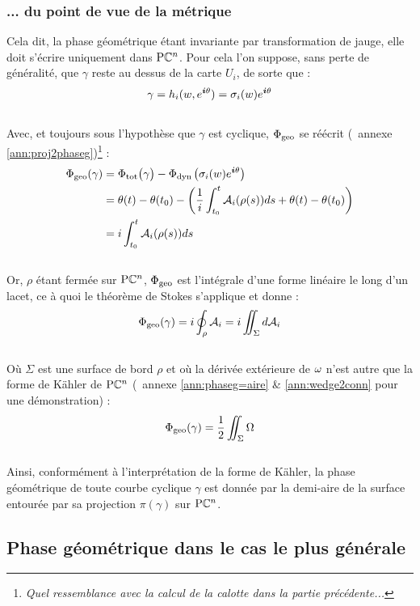 \subsubsection{... du point de vue de la métrique} \label{subsec:phase_g2aire}

Cela dit, la phase géométrique étant invariante par transformation de jauge, elle doit s'écrire uniquement dans $\text{\normalfont P}\mathbb{C}^{n}$. Pour cela l'on suppose, sans perte de généralité, que $\gamma$ reste au dessus de la carte $U_i$, de sorte que :
\[\gamma = h_i(w, e^{\boldsymbol{i} \theta}) = \sigma_i(w) e^{\boldsymbol{i} \theta}\]
\\
Avec, et toujours sous l'hypothèse que $\gamma$ est cyclique, $\Phi_{\text{\normalfont geo}}$ se réécrit (\cf~annexe \ref{ann:proj2phaseg})\footnote{\itshape
	Quel ressemblance avec la calcul de la calotte dans la partie précédente...}
 :
\begin{equation} \label{eq:phase_g=int2conn}
	\begin{aligned}
		\Phi_{\text{\normalfont geo}}(\gamma) &= \Phi_{\text{\normalfont tot}}\big( \gamma \big) - \Phi_{\text{\normalfont dyn}\, }\big( \sigma_i(w) e^{\boldsymbol{i} \theta} \big) \\
		&= \theta(t) - \theta(t_0) - \left( \frac{1}{i}\int_{t_0}^t \mathcal{A}_i(\rho(s)) ds + \theta(t) - \theta(t_0) \right) \\
		&= i \int_{t_0}^t \mathcal{A}_i(\rho(s)) ds
	\end{aligned}
\end{equation}
\\
Or, $\rho$ étant fermée sur $\text{\normalfont P}\mathbb{C}^{n}$, $\Phi_{\text{\normalfont geo}}$ est l'intégrale d'une forme linéaire le long d'un lacet, ce à quoi le théorème de Stokes s'applique et donne :
\[\Phi_{\text{\normalfont geo}}(\gamma) = i\oint_\rho \mathcal{A}_i = i\iint_\Sigma d \mathcal{A}_i\]
\\
Où $\Sigma$ est une surface de bord $\rho$ et où la dérivée extérieure de $\omega$ n'est autre que la forme de Kähler de $\text{\normalfont P}\mathbb{C}^{n}$ (\cf~annexe \ref{ann:phaseg=aire} \& \ref{ann:wedge2conn} pour une démonstration) :
\begin{equation} \label{eq:phaseg-aire2PC^n}
	\Phi_{\text{\normalfont geo}}(\gamma) = \frac{1}{2} \iint_{\Sigma} \Omega 
\end{equation}
\\
Ainsi, conformément à l'interprétation de la forme de Kähler, la phase géométrique de toute courbe cyclique $\gamma$ est donnée par la demi-aire
de la surface entourée par sa projection $\pi(\gamma)$ sur $\text{\normalfont P}\mathbb{C}^{n}$.
\skipl



\subsection{Phase géométrique dans le cas le plus générale} \label{subsec:phase_g-gene}

